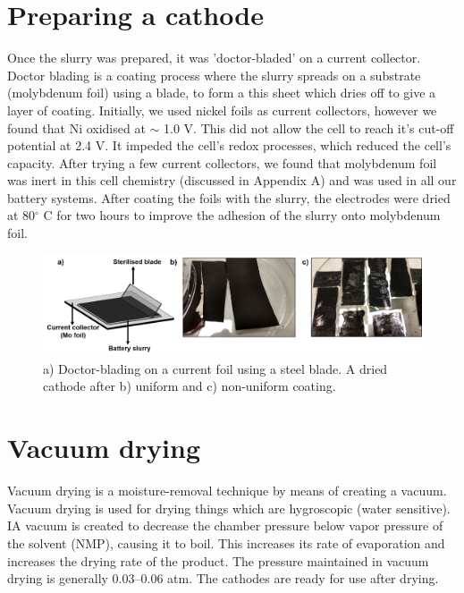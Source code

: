 \section{Preparing a cathode}
Once the slurry was prepared, it was 'doctor-bladed' on a current collector. Doctor blading is a coating process where the slurry spreads on a substrate (molybdenum foil)  using a blade, to form a this sheet which dries off to give a layer of coating.  Initially, we used nickel foils as current collectors, however we found that Ni oxidised at $\sim$ 1.0 V. This did not allow the cell to reach it's cut-off potential at 2.4 V. It impeded the cell's redox processes, which reduced the cell's capacity. After trying a few current collectors, we found that molybdenum foil was inert in this cell chemistry (discussed in Appendix A) and was used in all our battery systems. After coating the foils with the slurry, the electrodes were dried at 80$^{\circ}$ C for two hours to improve the adhesion of the slurry onto molybdenum foil. 
\begin{figure}[tbh!]
\centering
\includegraphics[width=\textwidth]{Figures/chap3fig/coating}
\caption{a) Doctor-blading on a current foil using a steel blade. A dried cathode after b) uniform and c) non-uniform coating.}
\label{Figures/chap3fig:coating}
\end{figure}
\section{Vacuum drying}
Vacuum drying is a moisture-removal technique by means of creating a vacuum. Vacuum drying is used for drying things which are hygroscopic (water sensitive). IA vacuum is created to decrease the chamber pressure below vapor pressure of the solvent (NMP), causing it to boil. This increases its rate of evaporation and increases the drying rate of the product. The pressure maintained in vacuum drying is generally 0.03–0.06 atm. The cathodes are ready for use after drying. 
